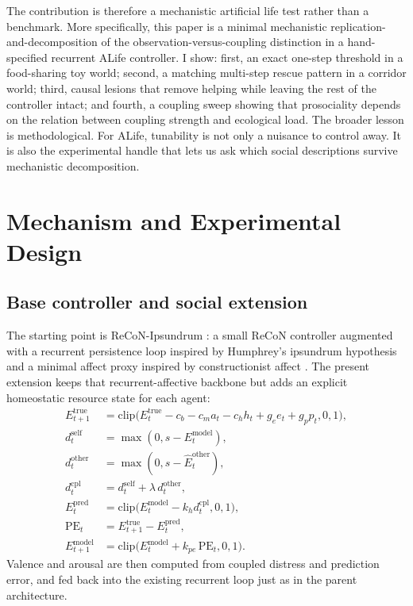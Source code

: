 \documentclass[letterpaper]{article}
\begin{document}
The contribution is therefore a mechanistic artificial life test rather than a benchmark. More specifically, this paper is a minimal mechanistic replication-and-decomposition of the observation-versus-coupling distinction in a hand-specified recurrent ALife controller. I show: first, an exact one-step threshold in a food-sharing toy world; second, a matching multi-step rescue pattern in a corridor world; third, causal lesions that remove helping while leaving the rest of the controller intact; and fourth, a coupling sweep showing that prosociality depends on the relation between coupling strength and ecological load. The broader lesson is methodological. For ALife, tunability is not only a nuisance to control away. It is also the experimental handle that lets us ask which social descriptions survive mechanistic decomposition.

\section{Mechanism and Experimental Design}

\subsection{Base controller and social extension}

The starting point is ReCoN-Ipsundrum \citep{Sanyal2026ReCoNIpsundrum}: a small ReCoN controller \citep{BachHerger2015ReCoN} augmented with a recurrent persistence loop inspired by Humphrey's ipsundrum hypothesis \citep{Humphrey2023Sentience} and a minimal affect proxy inspired by constructionist affect \citep{Barrett2017HowEmotions}. The present extension keeps that recurrent-affective backbone but adds an explicit homeostatic resource state for each agent:
{\small
\begin{equation}
\begin{aligned}
E^{\mathrm{true}}_{t+1} &= \mathrm{clip}\big(E^{\mathrm{true}}_t - c_b - c_m a_t - c_h h_t + g_e e_t + g_p p_t, 0, 1\big),\\
d^{\mathrm{self}}_t &= \max(0, s - E^{\mathrm{model}}_t),\\
d^{\mathrm{other}}_t &= \max(0, s - \hat E^{\mathrm{other}}_t),\\
d^{\mathrm{cpl}}_t &= d^{\mathrm{self}}_t + \lambda\, d^{\mathrm{other}}_t,\\
E^{\mathrm{pred}}_t &= \mathrm{clip}\big(E^{\mathrm{model}}_t - k_h d^{\mathrm{cpl}}_t, 0, 1\big),\\
\mathrm{PE}_t &= E^{\mathrm{true}}_{t+1} - E^{\mathrm{pred}}_t,\\
E^{\mathrm{model}}_{t+1} &= \mathrm{clip}\big(E^{\mathrm{model}}_t + k_{pe}\,\mathrm{PE}_t, 0, 1\big).
\end{aligned}
\label{eq:homeostat}
\end{equation}
}
Valence and arousal are then computed from coupled distress and prediction error, and fed back into the existing recurrent loop just as in the parent architecture.
\end{document}

